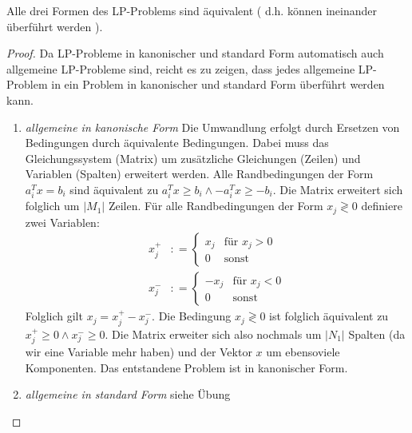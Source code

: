 \begin{theorem}
Alle drei Formen des LP-Problems sind äquivalent ( d.h. können ineinander überführt werden ).
\end{theorem}
\begin{proof}
Da LP-Probleme in kanonischer und standard Form automatisch auch allgemeine LP-Probleme sind, reicht es zu zeigen, dass jedes allgemeine LP-Problem in ein Problem in kanonischer und standard Form überführt werden kann.
\begin{enumerate}
\item{\textit{allgemeine in kanonische Form}} \newline
Die Umwandlung erfolgt durch Ersetzen von Bedingungen durch äquivalente Bedingungen. Dabei muss das Gleichungssystem (Matrix) um zusätzliche Gleichungen (Zeilen) und Variablen (Spalten) erweitert werden.
Alle Randbedingungen der Form $a_i^Tx = b_i$ sind äquivalent zu $a_i^Tx \geq b_i \land -a_i^Tx \geq -b_i$. Die Matrix erweitert sich folglich um $\lvert M_1 \rvert$ Zeilen. Für alle Randbedingungen der Form $x_j \gtrless 0$ definiere zwei Variablen:
\begin{align*}
 x_j^{+} &\colon= \begin{cases} %
x_j & \text{für } x_j > 0 \\
0 &\text{sonst}
\end{cases} \\
 x_j^{-} &\colon= \begin{cases} %
-x_j & \text{für } x_j < 0 \\
0 &\text{sonst}
\end{cases}
\end{align*}
Folglich gilt $x_j = x_j^{+} - x_j^{-}$. Die Bedingung $x_j \gtrless 0$ ist folglich äquivalent zu $x_j^{+} \geq 0 \land x_j^{-} \geq 0$. Die Matrix erweiter sich also nochmals um $\lvert N_1 \rvert$ Spalten (da wir eine Variable mehr haben) und der Vektor $x$ um ebensoviele Komponenten. Das entstandene Problem ist in kanonischer Form.
\item{\textit{allgemeine in standard Form}} \newline
siehe Übung
\end{enumerate}
\end{proof}

